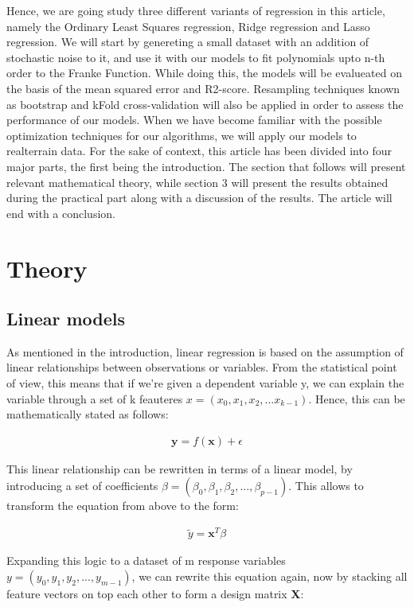 \documentclass[a4paper, 10pt]{article}
\begin{document}
Hence, we are going study three different variants of regression in this article, namely the Ordinary Least Squares regression, Ridge regression and Lasso regression. We will start by genereting a small dataset with an addition of stochastic noise to it, and use it with our models to fit polynomials upto n-th order to the Franke Function. While doing this, the models will be evalueated on the basis of the mean squared error and R2-score. Resampling techniques known as bootstrap and kFold cross-validation will also be applied in order to assess the performance of our models. When we have become familiar with the possible optimization techniques for our algorithms, we will apply our models to realterrain data.  
For the sake of context, this article has been divided into four major parts, the first being the introduction. The section that follows will present relevant mathematical theory, while section 3 will present the results obtained during the practical part along with a discussion of the results. The article will end with a conclusion.
\linespread{2.5}

\section{Theory}

\subsection{Linear models}
As mentioned in the introduction, linear regression is based on the assumption of linear relationships between observations or variables. From the statistical point of view, this means that if we're given a dependent variable y, we can explain the variable through a set of k feauteres $x = (x_0, x_1, x_2, ... x_{k-1})$. Hence, this can be mathematically stated as follows: 

\begin{gather*}
	\textbf{y} = f(\textbf{x}) + \epsilon
\end{gather*}

This linear relationship can be rewritten in terms of a linear model, by introducing a set of coefficients $\beta = (\beta_{0}, \beta_{1}, \beta_{2}, ... , \beta_{p-1})$. This allows to transform the equation from above to the form: 

\begin{gather*}
	\tilde{y} = \textbf{x}^T\beta
\end{gather*}

Expanding this logic to a dataset of m response variables $y = (y_0, y_1, y_2, ... , y_{m-1})$, we can rewrite this equation again, now by stacking all feature vectors on top each other to form a design matrix \textbf{X}: 
\end{document}

